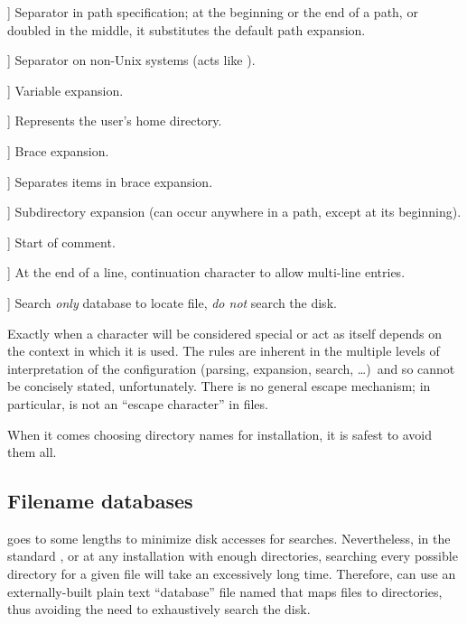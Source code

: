 \documentclass{article}
\begin{document}
\newcommand{\CODE}[1]{\makebox[3em][l]{\code{#1}}}
\begin{ttdescription}
\item[\CODE{:}] Separator in path specification; at the beginning or
  the end of a path, or doubled in the middle, it substitutes the
  default path expansion.\par
\item[\CODE{;}] Separator on non-Unix systems (acts like \code{:}).
\item[\CODE{\$}] Variable expansion.
\item[\CODE{\string~}] Represents the user's home directory.
\item[\CODE{\char`\{...\char`\}}] Brace expansion.
\item[\CODE{,}] Separates items in brace expansion.
\item[\CODE{//}] Subdirectory expansion (can occur anywhere in
    a path, except at its beginning).
\item[\CODE{\%{\rm\ and }\#}] Start of comment.
\item[\CODE{\bs}] At the end of a line, continuation character to allow
    multi-line entries.
\item[\CODE{!!}] Search \emph{only} database to locate file, \emph{do
    not} search the disk.
\end{ttdescription}

Exactly when a character will be considered special or act as itself
depends on the context in which it is used. The rules are inherent in
the multiple levels of interpretation of the configuration (parsing,
expansion, search, \ldots)\ and so cannot be concisely stated,
unfortunately. There is no general escape mechanism; in particular,
\samp{\bs} is not an ``escape character'' in  files.

When it comes choosing directory names for installation, it is safest to
avoid them all.

\subsection{Filename databases}
\label{sec:filename-database}

\KPS{} goes to some lengths to minimize disk accesses for searches.
Nevertheless, in the standard \TL, or at any installation with enough
directories, searching every possible directory for a given file will
take an excessively long time. Therefore, \KPS{} can use an
externally-built plain text ``database'' file named  that
maps files to directories, thus avoiding the need to exhaustively search
the disk.
\end{document}
